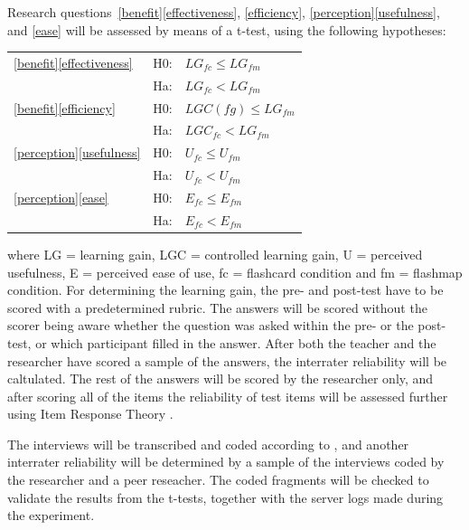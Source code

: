 
Research questions~\ref{benefit}\ref{effectiveness}, \ref{efficiency}, \ref{perception}\ref{usefulness}, and \ref{ease} will be assessed by means of a t-test, using the following hypotheses: 

\begin{tabular}{l l l}
\ref{benefit}\ref{effectiveness} & H0: & $LG_{fc} \leq LG_{fm}$ \\
                                 & Ha: & $LG_{fc} < LG_{fm}$ \\
\ref{benefit}\ref{efficiency}    & H0: & $LGC(fg) \leq LG_{fm}$ \\
                                 & Ha: & $ LGC_{fc} < LG_{fm}$ \\
\ref{perception}\ref{usefulness} & H0: & $U_{fc} \leq U_{fm}$ \\
                                 & Ha: & $U_{fc} < U_{fm}$ \\
\ref{perception}\ref{ease}       & H0: & $E_{fc} \leq E_{fm}$ \\
                                 & Ha: & $E_{fc} < E_{fm}$ \\
\end{tabular}

\noindent where LG = learning gain, LGC = controlled learning gain, U = perceived usefulness, E = perceived ease of use, fc = flashcard condition and fm = flashmap condition. For determining the learning gain, the pre- and post-test have to be scored with a predetermined rubric. The answers will be scored without the scorer being aware whether the question was asked within the pre- or the post-test, or which participant filled in the answer. After both the teacher and the researcher have scored a sample of the answers, the interrater reliability will be caltulated. The rest of the answers will be scored by the researcher only, and after scoring all of the items the reliability of test items will be assessed further using Item Response Theory \cite{irt}.

The interviews will be transcribed and coded according to , and another interrater reliability will be determined by a sample of the interviews coded by the researcher and a peer reseacher. The coded fragments will be checked to validate the results from the t-tests, together with the server logs made during the experiment.

